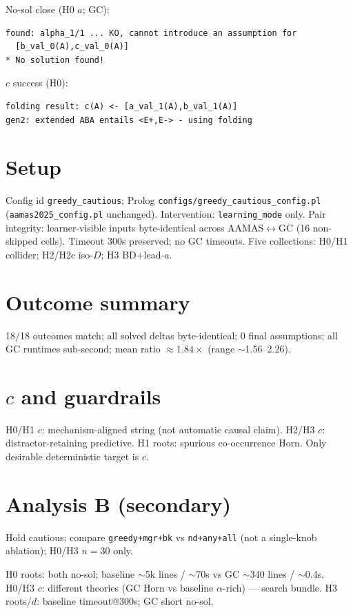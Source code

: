 \documentclass[11pt]{article}
\begin{document}
No-sol close (H0 \(a\); GC):
\begin{verbatim}
found: alpha_1/1 ... KO, cannot introduce an assumption for
  [b_val_0(A),c_val_0(A)]
* No solution found!
\end{verbatim}
\(c\) success (H0):
\begin{verbatim}
folding result: c(A) <- [a_val_1(A),b_val_1(A)]
gen2: extended ABA entails <E+,E-> - using folding
\end{verbatim}

\section{Setup}

Config id \texttt{greedy\_cautious}; Prolog
\texttt{configs/greedy\_cautious\_config.pl}
(\texttt{aamas2025\_config.pl} unchanged).
Intervention: \texttt{learning\_mode} only.
Pair integrity: learner-visible inputs byte-identical across AAMAS$\leftrightarrow$GC
(16 non-skipped cells).
Timeout 300s preserved; no GC timeouts.
Five collections: H0/H1 collider; H2/H2c iso-\(D\); H3 BD+lead-\(a\).

\section{Outcome summary}

18/18 outcomes match; all solved deltas byte-identical; 0 final assumptions;
all GC runtimes sub-second; mean ratio $\approx 1.84\times$ (range
$\sim$1.56--2.26).

\section{\(c\) and guardrails}

H0/H1 \(c\): mechanism-aligned string (not automatic causal claim).
H2/H3 \(c\): distractor-retaining predictive.
H1 roots: spurious co-occurrence Horn.
Only desirable deterministic target is \(c\).

\section{Analysis B (secondary)}

Hold cautious; compare \texttt{greedy+mgr+bk} vs \texttt{nd+any+all}
(not a single-knob ablation); H0/H3 \(n{=}30\) only.

H0 roots: both no-sol; baseline $\sim$5k lines / $\sim$70s vs GC $\sim$340 lines /
$\sim$0.4s.
H0/H3 \(c\): different theories (GC Horn vs baseline $\alpha$-rich) --- search
bundle.
H3 roots/\(d\): baseline timeout@300s; GC short no-sol.
\end{document}

